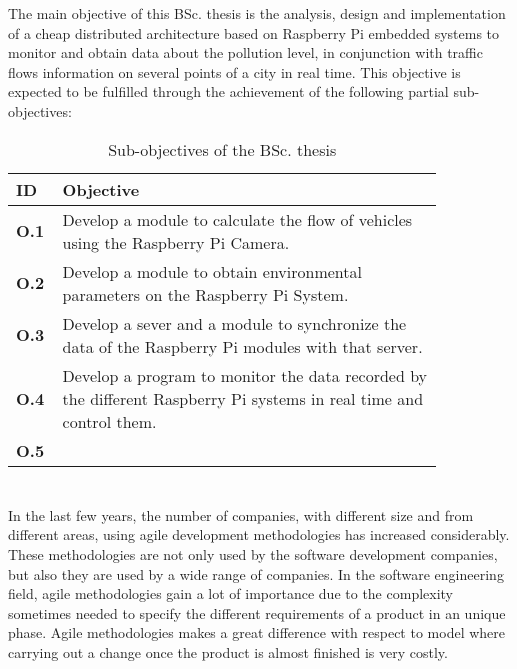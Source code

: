 \documentclass{pre-tfg}
\begin{document}
The main objective of this BSc. thesis is the analysis, design and implementation of a cheap distributed architecture based on Raspberry Pi embedded systems to monitor and obtain data about the pollution level, in conjunction with traffic flows information on several points of a city in real time. This objective is expected to be fulfilled through the achievement of the following partial sub-objectives:

\begin{table}[!h]
	\centering
	\caption{Sub-objectives of the BSc. thesis}
	\label{tab:sub-objectives}
	
	\begin{tabular}{m{0.05\linewidth}m{0.8\linewidth}}
		\textbf{ID} & \textbf{Objective} \\
		\hline
		
		\textbf{O.1}& Develop a module to calculate the flow of vehicles using the Raspberry Pi Camera.  \\
		
		\textbf{O.2}& Develop a module to obtain environmental parameters on the Raspberry Pi System.  \\
		
		\textbf{O.3}& Develop a sever and a module to synchronize the data of the Raspberry Pi modules with that server.  \\
		
		\textbf{O.4}& Develop a program to monitor the data recorded by the different Raspberry Pi systems in real time and control them.  \\
		
		\textbf{O.5}& \REDNOTE{------------------------------------------------------------}  \\
		
		\hline
	\end{tabular}
\end{table}


\section{}

In the last few years, the number of companies, with different size and from different areas, using agile development methodologies has increased considerably. These methodologies are not only used by the software development companies, but also they are used by a wide range of companies. In the software engineering field, agile methodologies gain a lot of importance due to the complexity sometimes needed to specify the different requirements of a product in an unique phase. Agile methodologies makes a great difference with respect to  model where carrying out a change once the product is almost finished is very costly.
\end{document}
